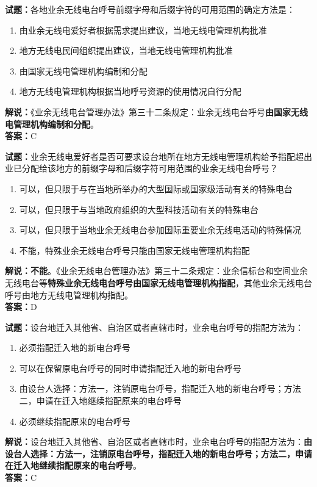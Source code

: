 \documentclass{ctexbook}
\begin{document}
\bigskip

\noindent\textbf{试题：}各地业余无线电台呼号前缀字母和后缀字符的可用范围的确定方法是：
\begin{enumerate}[leftmargin=3em]
  \item 由业余无线电爱好者根据需求提出建议，当地无线电管理机构批准
  \item 地方无线电民间组织提出建议，当地无线电管理机构批准
  \item 由国家无线电管理机构编制和分配
  \item 地方无线电管理机构根据当地呼号资源的使用情况自行分配
\end{enumerate}
\noindent\textbf{解说：}《业余无线电台管理办法》第三十二条规定：业余无线电台呼号\textbf{由国家无线电管理机构编制和分配}。\\\noindent\textbf{答案：}C

\bigskip

\noindent\textbf{试题：}业余无线电爱好者是否可要求设台地所在地方无线电管理机构给予指配超出业已分配给该地方的前缀字母和后缀字符可用范围的业余无线电台呼号？
\begin{enumerate}[leftmargin=3em]
  \item 可以，但只限于与在当地所举办的大型国际或国家级活动有关的特殊电台
  \item 可以，但只限于与当地政府组织的大型科技活动有关的特殊电台
  \item 可以，但只限于当地业余无线电台参加国际重要业余无线电活动的特殊情况
  \item 不能，特殊业余无线电台呼号只能由国家无线电管理机构指配
\end{enumerate}
\textbf{解说：不能}。《业余无线电台管理办法》第三十二条规定：业余信标台和空间业余无线电台等\textbf{特殊业余无线电台呼号由国家无线电管理机构指配}，其他业余无线电台呼号由地方无线电管理机构指配。\\\noindent\textbf{答案：}D

\bigskip

\noindent\textbf{试题：}设台地迁入其他省、自治区或者直辖市时，业余电台呼号的指配方法为：
\begin{enumerate}[leftmargin=3em]
  \item 必须指配迁入地的新电台呼号
  \item 可以在保留原电台呼号的同时申请指配迁入地的新电台呼号
  \item 由设台人选择：方法一，注销原电台呼号，指配迁入地的新电台呼号；方法二，申请在迁入地继续指配原来的电台呼号
  \item 必须继续指配原来的电台呼号
\end{enumerate}
\noindent\textbf{解说：}设台地迁入其他省、自治区或者直辖市时，业余电台呼号的指配方法为：\textbf{由设台人选择：方法一，注销原电台呼号，指配迁入地的新电台呼号；方法二，申请在迁入地继续指配原来的电台呼号}。\\\noindent\textbf{答案：}C
\end{document}
